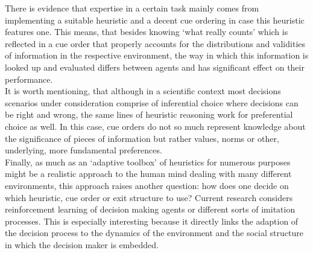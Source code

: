 There is evidence \citep{Garcia-Retamero2009,Pachur2013} that expertise in a certain task mainly comes from implementing a suitable heuristic and a decent cue ordering in case this heuristic features one. This means, that besides knowing `what really counts' which is reflected in a cue order that properly accounts for the distributions and validities of information in the respective environment, the way in which this information is looked up and evaluated differs between agents and has significant effect on their performance.\\
It is worth mentioning, that although in a scientific context most decisions scenarios under consideration comprise of inferential choice where decisions can be right and wrong, the same lines of heuristic reasoning work for preferential choice as well. In this case, cue orders do not so much represent knowledge about the significance of pieces of information but rather values, norms or other, underlying, more fundamental preferences.\\
Finally, as much as an `adaptive toolbox' of heuristics for numerous purposes might be a realistic approach to the human mind dealing with many different environments, this approach raises another question: how does one decide on which heuristic, cue order or exit structure to use? Current research \citep{garcia2009does,Rieskamp2006} considers reinforcement learning of decision making agents or different sorts of imitation processes. This is especially interesting because it directly links the adaption of the decision process to the dynamics of the environment and the social structure in which the decision maker is embedded.\\

